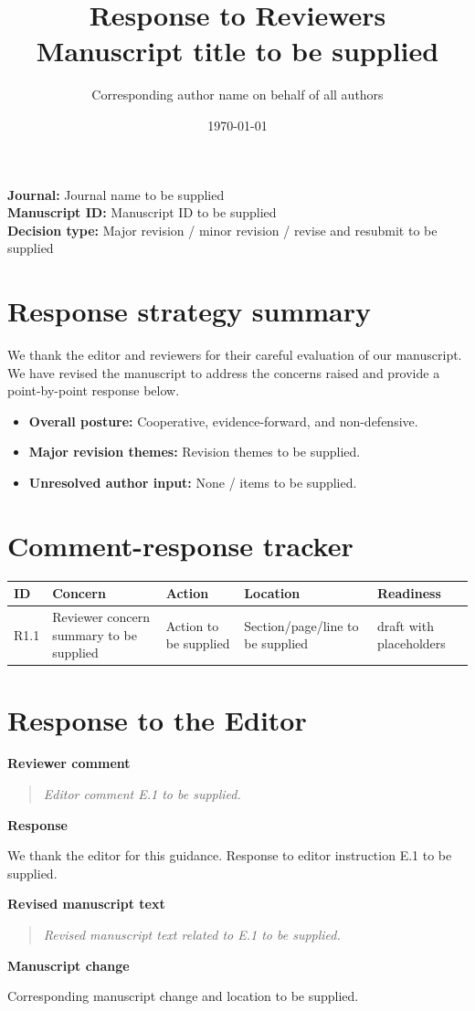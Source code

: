 \documentclass[11pt]{article}
\title{Response to Reviewers\\
\large Manuscript title to be supplied}
\author{Corresponding author name on behalf of all authors}
\date{\today}
\newcommand{\ReviewerComment}[1]{%
  \par\noindent\textbf{Reviewer comment}\par
  \begin{quote}\itshape #1\end{quote}
}
\newcommand{\AuthorResponse}[1]{%
  \par\noindent\textbf{Response}\par
  #1\par
}
\newcommand{\RevisedExcerpt}[1]{%
  \par\noindent\textbf{Revised manuscript text}\par
  \begin{quote}\itshape #1\end{quote}
}
\newcommand{\ManuscriptChange}[1]{%
  \par\noindent\textbf{Manuscript change}\par
  #1\par
}
\newcommand{\EditorSection}{%
  \clearpage
  \section*{Response to the Editor}
}
\begin{document}
\maketitle

\noindent\textbf{Journal:} Journal name to be supplied\\
\textbf{Manuscript ID:} Manuscript ID to be supplied\\
\textbf{Decision type:} Major revision / minor revision / revise and resubmit to be supplied

\section*{Response strategy summary}

We thank the editor and reviewers for their careful evaluation of our manuscript.
We have revised the manuscript to address the concerns raised and provide a
point-by-point response below.

\begin{itemize}[leftmargin=*]
  \item \textbf{Overall posture:} Cooperative, evidence-forward, and non-defensive.
  \item \textbf{Major revision themes:} Revision themes to be supplied.
  \item \textbf{Unresolved author input:} None / items to be supplied.
\end{itemize}

\section*{Comment-response tracker}

\begin{longtable}{>{\raggedright\arraybackslash}p{}
                  >{\raggedright\arraybackslash}p{}
                  >{\raggedright\arraybackslash}p{}
                  >{\raggedright\arraybackslash}p{}
                  >{\raggedright\arraybackslash}p{}}
\textbf{ID} & \textbf{Concern} & \textbf{Action} & \textbf{Location} & \textbf{Readiness}\\
\hline
R1.1 & Reviewer concern summary to be supplied & Action to be supplied & Section/page/line to be supplied & draft with placeholders\\
\end{longtable}

\EditorSection

\ReviewerComment{Editor comment E.1 to be supplied.}
\AuthorResponse{We thank the editor for this guidance. Response to editor instruction E.1 to be supplied.}
\RevisedExcerpt{Revised manuscript text related to E.1 to be supplied.}
\ManuscriptChange{Corresponding manuscript change and location to be supplied.}
\end{document}

